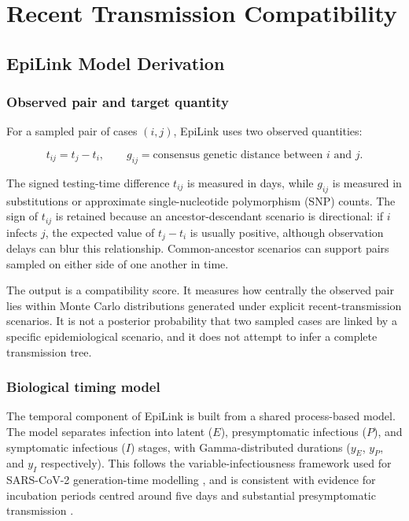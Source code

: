 \chapter{Recent Transmission Compatibility}\label{app:epilink}

\section{EpiLink Model Derivation}\label{sec:app_ch3_model_derivation}

\subsection{Observed pair and target quantity}\label{sec:app_ch3_observed_pair}

For a sampled pair of cases $(i,j)$, EpiLink uses two observed quantities:

\[
	t_{ij} = t_j - t_i,
	\qquad
	g_{ij} = \text{consensus genetic distance between } i \text{ and } j.
\]

The signed testing-time difference $t_{ij}$ is measured in days, while $g_{ij}$ is measured in substitutions or approximate single-nucleotide polymorphism (SNP) counts. The sign of $t_{ij}$ is retained because an ancestor-descendant scenario is directional: if $i$ infects $j$, the expected value of $t_j-t_i$ is usually positive, although observation delays can blur this relationship. Common-ancestor scenarios can support pairs sampled on either side of one another in time.

The output is a compatibility score. It measures how centrally the observed pair lies within Monte Carlo distributions generated under explicit recent-transmission scenarios. It is not a posterior probability that two sampled cases are linked by a specific epidemiological scenario, and it does not attempt to infer a complete transmission tree.

\subsection{Biological timing model}\label{sec:app_ch3_hart_model}

The temporal component of EpiLink is built from a shared process-based model. The model separates infection into latent ($E$), presymptomatic infectious ($P$), and symptomatic infectious ($I$) stages, with Gamma-distributed durations ($y_E$, $y_P$, and $y_I$ respectively). This follows the variable-infectiousness framework used for SARS-CoV-2 generation-time modelling \citep{Hart2021,Hart2022}, and is consistent with evidence for incubation periods centred around five days and substantial presymptomatic transmission \citep{He2020,Ferretti2020,Lauer2020,McAloon2020}.


